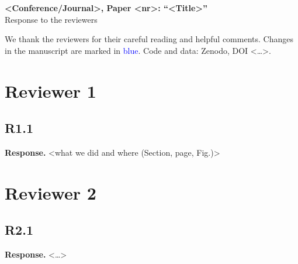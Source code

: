 \documentclass[11pt]{article}
\newenvironment{comment}{\par\medskip\noindent\itshape}{\par}
\newenvironment{reply}{\par\smallskip\noindent\textbf{Response.} }{\par}
\begin{document}
\noindent\textbf{<Conference/Journal>, Paper <nr>: ``<Title>''}\\
Response to the reviewers

\medskip
We thank the reviewers for their careful reading and helpful comments. Changes in the manuscript are
marked in \textcolor{blue}{blue}. Code and data: Zenodo, DOI <…>.

\section*{Reviewer 1}
\subsection*{R1.1}
\begin{comment}<quoted comment>\end{comment}
\begin{reply}<what we did and where (Section, page, Fig.)>\end{reply}

\section*{Reviewer 2}
\subsection*{R2.1}
\begin{comment}<quoted comment>\end{comment}
\begin{reply}<…>\end{reply}
\end{document}
